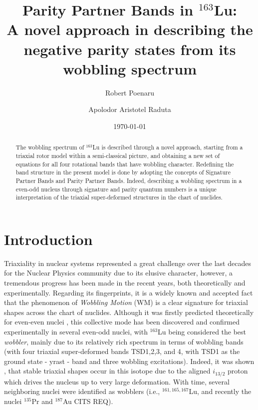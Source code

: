 \documentclass[%
 reprint,
 amsmath,
 amssymb,
 aps,
 floatfix,
]{revtex4-2}
\begin{document}
\title{Parity Partner Bands in $^{163}$Lu: \\ A novel approach in describing the negative parity states from its wobbling spectrum}%

\author{Robert Poenaru}%
\author{Apolodor Aristotel Raduta}%
%
%

\date{\today}

\begin{abstract}
The wobbling spectrum of $^{163}$Lu is described through a novel approach, starting from a triaxial rotor model within a semi-classical picture, and obtaining a new set of equations for all four rotational bands that have wobbling character. Redefining the band structure in the present model is done by adopting the concepts of Signature Partner Bands and Parity Partner Bands. Indeed, describing a wobbling spectrum in a even-odd nucleus through signature and parity quantum numbers is a unique interpretation of the triaxial super-deformed structures in the chart of nuclides.
\end{abstract}

\maketitle


\section{Introduction}

Triaxiality in nuclear systems represented a great challenge over the last decades for the Nuclear Physics community due to its elusive character, however, a tremendous progress has been made in the recent years, both theoretically and experimentally. Regarding its fingerprints, it is a widely known and accepted fact that the phenomenon of \emph{Wobbling Motion} (WM) is a clear signature for triaxial shapes across the chart of nuclides. Although it was firstly predicted theoretically for even-even nuclei \cite{bohr1998nuclear}, this collective mode has been discovered and confirmed experimentally in several even-odd nuclei, with $^{163}$Lu being considered the best \emph{wobbler}, mainly due to its relatively rich spectrum in terms of wobbling bands (with four triaxial super-deformed bands TSD1,2,3, and 4, with TSD1 as the ground state - yrast - band and three wobbling excitations). Indeed, it was shown \cite{odegaard2001evidence}, \cite{jensen2002wobbling} that stable triaxial shapes occur in this isotope due to the aligned $i_{13/2}$ proton which drives the nucleus up to very large deformation. With time, several neighboring nuclei were identified as wobblers (i.e., $^{161,165,167}$Lu, and recently the nuclei $^{135}$Pr and $^{187}$Au {\color{red}CITS REQ}).
\end{document}
